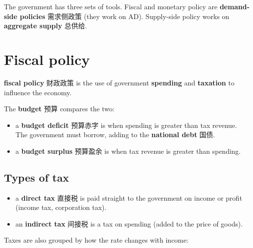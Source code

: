 \documentclass[11pt]{article}
\begin{document}
The government has three sets of tools. Fiscal and monetary policy are \textbf{demand-side policies} 需求侧政策 (they work on AD). Supply-side policy works on \textbf{aggregate supply} 总供给.

\section*{Fiscal policy}

\textbf{fiscal policy} 财政政策 is the use of government \textbf{spending} and \textbf{taxation} to influence the economy.

The \textbf{budget} 预算 compares the two:

\begin{itemize}
\item a \textbf{budget deficit} 预算赤字 is when spending is greater than tax revenue. The government must borrow, adding to the \textbf{national debt} 国债.

\item a \textbf{budget surplus} 预算盈余 is when tax revenue is greater than spending.

\end{itemize}

\subsection*{Types of tax}

\begin{itemize}
\item a \textbf{direct tax} 直接税 is paid straight to the government on income or profit (income tax, corporation tax).

\item an \textbf{indirect tax} 间接税 is a tax on spending (added to the price of goods).

\end{itemize}

Taxes are also grouped by how the rate changes with income:

\begin{center}
\end{center}
\end{document}

